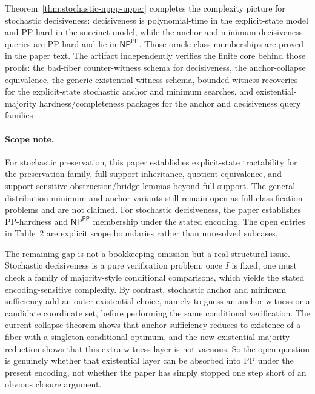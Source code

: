 Theorem~\ref{thm:stochastic-nppp-upper} completes the complexity picture for stochastic decisiveness: decisiveness is polynomial-time in the explicit-state model and PP-hard in the succinct model, while the anchor and minimum decisiveness queries are PP-hard and lie in $\textsf{NP}^{\textsf{PP}}$. Those oracle-class memberships are proved in the paper text. The artifact independently verifies the finite core behind those proofs: the bad-fiber counter-witness schema for decisiveness, the anchor-collapse equivalence, the generic existential-witness schema, bounded-witness recoveries for the explicit-state stochastic anchor and minimum searches, and existential-majority hardness/completeness packages for the anchor and decisiveness query families 

\paragraph{Scope note.}
For stochastic preservation, this paper establishes explicit-state tractability for the preservation family, full-support inheritance, quotient equivalence, and support-sensitive obstruction/bridge lemmas beyond full support. The general-distribution minimum and anchor variants still remain open as full classification problems and are not claimed. For stochastic decisiveness, the paper establishes PP-hardness and $\textsf{NP}^{\textsf{PP}}$ membership under the stated encoding. The open entries in Table~2 are explicit scope boundaries rather than unresolved subcases.

The remaining gap is not a bookkeeping omission but a real structural issue. Stochastic decisiveness is a pure verification problem: once $I$ is fixed, one must check a family of majority-style conditional comparisons, which yields the stated encoding-sensitive complexity. By contrast, stochastic anchor and minimum sufficiency add an outer existential choice, namely to guess an anchor witness or a candidate coordinate set, before performing the same conditional verification. The current collapse theorem  shows that anchor sufficiency reduces to existence of a fiber with a singleton conditional optimum, and the new existential-majority reduction shows that this extra witness layer is not vacuous. So the open question is genuinely whether that existential layer can be absorbed into PP under the present encoding, not whether the paper has simply stopped one step short of an obvious closure argument.


